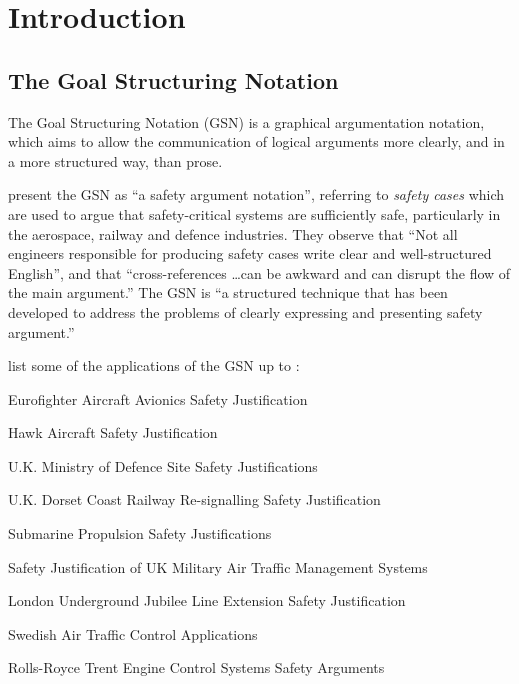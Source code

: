 \chapter{Introduction}




\section{The Goal Structuring Notation}

The Goal Structuring Notation (GSN) is a graphical argumentation notation,
which aims to allow the communication of logical arguments more clearly, and in a more structured way, than prose.

\citet{kelly2004goal} present the GSN as ``a safety argument notation'',
referring to \emph{safety cases} which are used to argue that safety-critical systems are sufficiently safe,
particularly in the aerospace, railway and defence industries.
They observe that
``Not all engineers responsible for producing safety cases write clear and
well-structured English'',
and that
``cross-references \ldots can be awkward and can disrupt the flow of the main argument.'' 
The GSN is ``a structured technique that has been developed to address the
problems of clearly expressing and presenting safety argument.''

\citet{Habli:2006:PPC:1183088.1183090} list some of the applications of the GSN up to \citeyear{Habli:2006:PPC:1183088.1183090}:

\begin{itemize*}
  \item{Eurofighter Aircraft Avionics Safety Justification}
  \item{Hawk Aircraft Safety Justification}
  \item{U.K. Ministry of Defence Site Safety Justifications}
  \item{U.K. Dorset Coast Railway Re-signalling Safety Justification}
  \item{Submarine Propulsion Safety Justifications}
  \item{Safety Justification of UK Military Air Traffic Management Systems}
  \item{London Underground Jubilee Line Extension Safety Justification}
  \item{Swedish Air Traffic Control Applications}
  \item{Rolls-Royce Trent Engine Control Systems Safety Arguments}
\end{itemize*}

